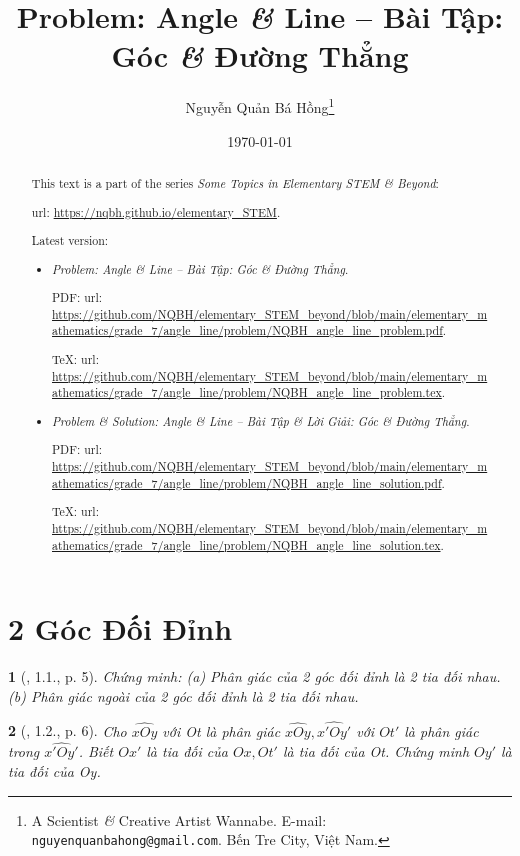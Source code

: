 \documentclass{article}
\title{Problem: Angle {\it\&} Line -- Bài Tập: Góc {\it\&} Đường Thẳng}
\author{Nguyễn Quản Bá Hồng\footnote{A Scientist {\it\&} Creative Artist Wannabe. E-mail: {\tt nguyenquanbahong@gmail.com}. Bến Tre City, Việt Nam.}}
\date{\today}
\newtheorem{baitoan}{}
\begin{document}
\maketitle
\begin{abstract}
	This text is a part of the series {\it Some Topics in Elementary STEM \& Beyond}:
	
	{\sc url}: \url{https://nqbh.github.io/elementary_STEM}.
	
	Latest version:
	\begin{itemize}
		\item {\it Problem: Angle \& Line -- Bài Tập: Góc \& Đường Thẳng}.
		
		PDF: {\sc url}: \url{https://github.com/NQBH/elementary_STEM_beyond/blob/main/elementary_mathematics/grade_7/angle_line/problem/NQBH_angle_line_problem.pdf}.
		
		\TeX: {\sc url}: \url{https://github.com/NQBH/elementary_STEM_beyond/blob/main/elementary_mathematics/grade_7/angle_line/problem/NQBH_angle_line_problem.tex}.
		\item {\it Problem \& Solution: Angle \& Line -- Bài Tập \& Lời Giải: Góc \& Đường Thẳng}.
		
		PDF: {\sc url}: \url{https://github.com/NQBH/elementary_STEM_beyond/blob/main/elementary_mathematics/grade_7/angle_line/problem/NQBH_angle_line_solution.pdf}.
		
		\TeX: {\sc url}: \url{https://github.com/NQBH/elementary_STEM_beyond/blob/main/elementary_mathematics/grade_7/angle_line/problem/NQBH_angle_line_solution.tex}.
	\end{itemize}
\end{abstract}
\tableofcontents


\section{2 Góc Đối Đỉnh}

\begin{baitoan}[\cite{Hung_Mai_Toan_7_hinh_hoc}, 1.1., p. 5]
	Chứng minh: (a) Phân giác của 2 góc đối đỉnh là 2 tia đối nhau. (b) Phân giác ngoài của 2 góc đối đỉnh là 2 tia đối nhau.
\end{baitoan}

\begin{baitoan}[\cite{Hung_Mai_Toan_7_hinh_hoc}, 1.2., p. 6]
	Cho $\widehat{xOy}$ với Ot là phân giác $\widehat{xOy},\widehat{x'Oy'}$ với $Ot'$ là phân giác trong $\widehat{x'Oy'}$. Biết $Ox'$ là tia đối của $Ox,Ot'$ là tia đối của Ot. Chứng minh $Oy'$ là tia đối của Oy.
\end{baitoan}
\end{document}
